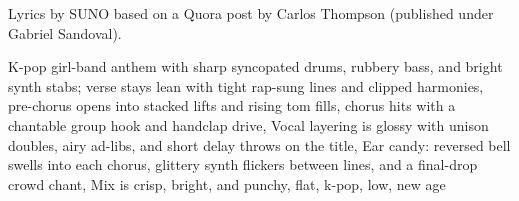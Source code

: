 
\begin{notes}
Lyrics by SUNO based on a Quora post by Carlos Thompson (published under Gabriel Sandoval).
\end{notes}
\begin{style}
K-pop girl-band anthem with sharp syncopated drums, rubbery bass, and bright synth stabs; verse stays lean with tight rap-sung lines and clipped harmonies, pre-chorus opens into stacked lifts and rising tom fills, chorus hits with a chantable group hook and handclap drive, Vocal layering is glossy with unison doubles, airy ad-libs, and short delay throws on the title, Ear candy: reversed bell swells into each chorus, glittery synth flickers between lines, and a final-drop crowd chant, Mix is crisp, bright, and punchy, flat, k-pop, low, new age
\end{style}
